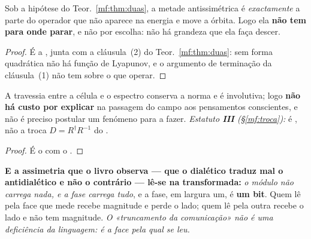 \documentclass[../livro.tex]{subfiles}
\begin{document}
\begin{corolario}\label{mf:cor:ansiedade}
Sob a hipótese do Teor.~\ref{mf:thm:duas}, a metade antissimétrica é
\emph{exactamente} a parte do operador que não aparece na energia e move a
órbita. Logo ela \textbf{não tem para onde parar}, e não por escolha: não há
grandeza que ela faça descer.
\end{corolario}

\begin{proof}
É a , junta com a cláusula~(2) do Teor.~\ref{mf:thm:duas}: sem
forma quadrática não há função de Lyapunov, e o argumento de terminação da
cláusula~(1) não tem sobre o que operar.
\end{proof}

\begin{corolario}\label{mf:cor:ponte}
A travessia entre a célula e o espectro conserva a norma e é involutiva; logo
\textbf{não há custo por explicar} na passagem do campo aos pensamentos
conscientes, e não é preciso postular um fenómeno para a fazer.
\emph{Estatuto \textbf{III} (\S\ref{mf:troca}):} é , não a troca
$D=R^{\dagger}R^{-1}$ do .
\end{corolario}

\begin{proof}
É o 
com o .
\end{proof}

\medskip\noindent\textbf{E a assimetria que o livro observa --- que o dialético
traduz mal o antidialético e não o contrário --- lê-se na transformada:}
\emph{o módulo não carrega nada, e a fase carrega tudo}, e a fase, em largura um,
é \textbf{um bit}. Quem lê pela face que mede recebe magnitude e perde o lado;
quem lê pela outra recebe o lado e não tem magnitude. \emph{O «truncamento da
comunicação» não é uma deficiência da linguagem: é a face pela qual se leu.}

\end{document}

